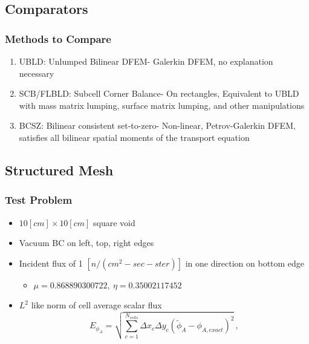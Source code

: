\documentclass{beamer}
\newcommand{\be}{\begin{equation*}}   %
\newcommand{\ee}{\end{equation*}}
\newcommand{\pec}{\, ,}
\begin{document}
\subsection{Comparators}
\begin{frame}
\frametitle{Methods to Compare}
\begin{enumerate}
\item UBLD: Unlumped Bilinear DFEM- Galerkin DFEM, no explanation necessary \vspace{0.2in}
\item SCB/FLBLD: Subcell Corner Balance- On rectangles, Equivalent to UBLD with mass matrix lumping, surface matrix lumping, and other manipulations \vspace{0.2in}
\item BCSZ: Bilinear consistent set-to-zero- Non-linear, Petrov-Galerkin DFEM, satisfies all bilinear spatial moments of the transport equation
\end{enumerate}

\end{frame}
\subsection{Structured Mesh}
\begin{frame}
\frametitle{Test Problem}

\begin{itemize}
\item $10[cm] \times 10[cm]$ square void
\item Vacuum BC on left, top, right edges
\item Incident flux of 1 $[n/(cm^2-sec-ster)]$ in one direction on bottom edge
\begin{itemize}
\item $\mu =0.868890300722,~\eta=0.35002117452$ 
\end{itemize}
\item $L^2$ like norm of cell average scalar flux
\be
E_{\phi_A} = \sqrt{ \sum_{c=1}^{N_{cells}}{ \Delta x_c \Delta y_c (\widetilde{\phi}_A - \phi_{A,exact} )^2} } \pec
\ee
\end{itemize}

\end{frame}
\end{document}
